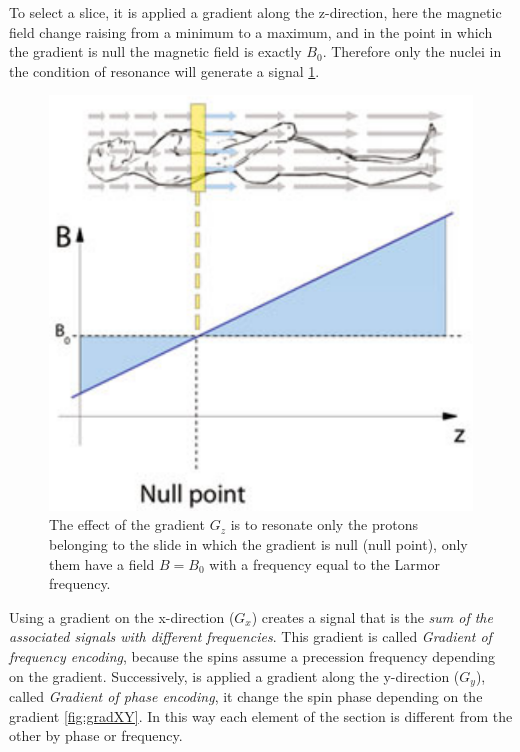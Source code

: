  \noindent To select a slice, it is applied a gradient along the z-direction, here the magnetic field change raising from a minimum to a maximum, and in the point in which the gradient is null the magnetic field is exactly $B_0$. Therefore only the nuclei in the condition of resonance will generate a signal \ref{fig:gradientZ}.

 \begin{figure}[h]
   \centering
   \begin{minipage}[c]{0.3\textwidth}
      \includegraphics[width=\textwidth]{images/gradZ.png}
   \end{minipage}\hfill
   \begin{minipage}[b]{0.65\textwidth}
      \caption{The effect of the gradient $G_z$ is to resonate only the protons belonging to the slide in which the gradient is null (null point), only them have a field $B = B_0$ with a frequency equal to the Larmor frequency. \cite{elementiRisonanza}}
      \label{fig:gradientZ}
   \end{minipage}
 \end{figure}

 \noindent Using a gradient on the x-direction ($G_x$) creates a signal that is the \emph{sum of the associated signals with different frequencies}. This gradient is called \emph{Gradient of frequency encoding}, because the spins assume a precession frequency depending on the gradient. Successively, is applied a gradient along the y-direction ($G_y$), called \emph{Gradient of phase encoding}, it change the spin phase depending on the gradient \ref{fig:gradXY}. In this way each element of the section is different from the other by phase or frequency.

